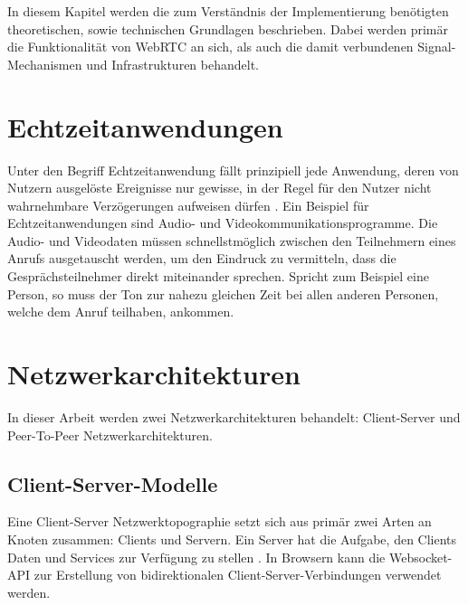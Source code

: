 In diesem Kapitel werden die zum Verständnis der Implementierung benötigten theoretischen, sowie technischen Grundlagen beschrieben. Dabei werden primär die Funktionalität von \acs{WebRTC} an sich, als auch die damit verbundenen Signal-Mechanismen und Infrastrukturen behandelt.

\section{Echtzeitanwendungen}
Unter den Begriff Echtzeitanwendung fällt prinzipiell jede Anwendung, deren von Nutzern ausgelöste Ereignisse nur gewisse, in der Regel für den Nutzer nicht wahrnehmbare Verzögerungen aufweisen dürfen \cite{realtimeapp}. Ein Beispiel für Echtzeitanwendungen sind Audio- und Videokommunikationsprogramme. Die Audio- und Videodaten müssen schnellstmöglich zwischen den Teilnehmern eines Anrufs ausgetauscht werden, um den Eindruck zu vermitteln, dass die Gesprächsteilnehmer direkt miteinander sprechen. Spricht zum Beispiel eine Person, so muss der Ton zur nahezu gleichen Zeit bei allen anderen Personen, welche dem Anruf teilhaben, ankommen.

\section{Netzwerkarchitekturen}
In dieser Arbeit werden zwei Netzwerkarchitekturen behandelt: Client-Server und Peer-To-Peer Netzwerkarchitekturen.

\subsection{Client-Server-Modelle}
Eine Client-Server Netzwerktopographie setzt sich aus primär zwei Arten an Knoten zusammen: Clients und Servern. Ein Server hat die Aufgabe, den Clients Daten und Services zur Verfügung zu stellen \cite{silveira2015}. In Browsern kann die Websocket-API zur Erstellung von bidirektionalen Client-Server-Verbindungen verwendet werden.\par


